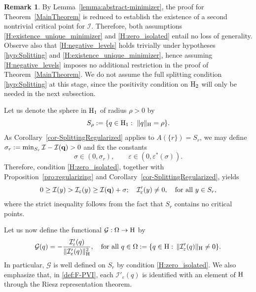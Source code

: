 \documentclass{article}
\newcommand{\boI}{\mathcal{I}}
\newcommand{\boG}{\mathcal{G}}
\newcommand{\Hilb}{{\textnormal H}}
\newcommand{\minq}{{\bf q}}
\theoremstyle{definition}
\newtheorem{remark}{Remark}[section]
\begin{document}
\begin{remark}
By Lemma~\ref{lemma:abstract-minimizer}, the proof for Theorem~\ref{MainTheorem} is reduced to establish the existence of a second nontrivial critical point for $\boI$. Therefore, both assumptions \eqref{H:existence_unique_minimizer} and \eqref{H:zero_isolated} entail no loss of generality. Observe also that \eqref{H:negative_levels} holds trivially under hypotheses  \eqref{hyp:Splitting} and \eqref{H:existence_unique_minimizer}, hence assuming \eqref{H:negative_levels} imposes no additional restriction in the proof of Theorem~\ref{MainTheorem}. We do not assume the full splitting condition \eqref{hyp:Splitting} at this stage, since the positivity condition on $\Hilb_2$ will only be needed in the next subsection.
\end{remark}

Let us denote the sphere in $\Hilb_1$ of radius $\rho>0$ by
\begin{equation}\label{def:Sphere}
    S_\rho:=\{q\in\Hilb_1:\ \|q\|_\Hilb=\rho\}.
\end{equation}
As Corollary~\ref{cor-SplittingRegularized} applies to $A(\{r\})=S_r$, we may define $\sigma_r:=\min_{S_r}\boI-\boI(\minq)>0$ and fix the constants
\begin{equation}\label{def:Constant}
\sigma\in(0,\sigma_r),\quad\quad\varepsilon\in(0,\varepsilon^*(\sigma)).
\end{equation}
Therefore, condition \eqref{H:zero_isolated}, together with Proposition~\ref{pro:regularizing} and Corollary~\ref{cor-SplittingRegularized}, yields
\begin{equation}\label{cond:non-degeneracy}
	0\geq\boI(y)>\boI_\varepsilon(y)\geq\boI(\minq)+\sigma;\quad\boI'_\varepsilon(y)\neq0,\quad\hbox{for all }y\in S_r,
\end{equation}
where the strict inequality follows from the fact that $S_r$ contains no critical points.

Let us now define the functional ${\boG}:\Omega\to\Hilb$ by
\begin{equation}\label{def:F-PVI}
	{\boG}(q)=-\frac{\boI'_\varepsilon(q)}{\|\boI_\varepsilon'(q)\|_\Hilb^2},\quad\text{for all }q\in \Omega:=\{q\in \Hilb:\, \|\boI'_\varepsilon(q)\|_\Hilb\not=0\}.
\end{equation}
In particular, ${\boG}$ is well defined on $S_r$ by condition \eqref{H:zero_isolated}. We also emphasize that, in \eqref{def:F-PVI}, each $\boI'_\varepsilon(q)$ is identified with an element of $\Hilb$ through the Riesz representation theorem.
\end{document}

